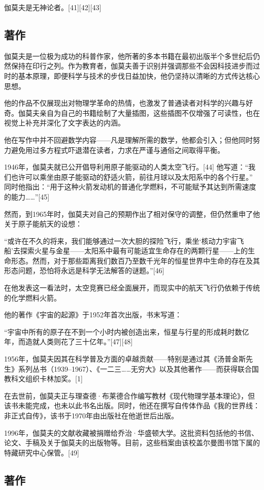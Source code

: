 伽莫夫是无神论者。[41][42][43]
\subsection{著作}
伽莫夫是一位极为成功的科普作家，他所著的多本书籍在最初出版半个多世纪后仍然保持在印行之列。作为教育者，伽莫夫善于识别并强调那些不会因科技进步而过时的基本原理，即便科学与技术的步伐日益加快，他仍坚持以清晰的方式传达核心思想。

他的作品不仅展现出对物理学革命的热情，也激发了普通读者对科学的兴趣与好奇。伽莫夫亲自为自己的书籍绘制了大量插图，这些插图不仅增强了可读性，也在视觉上补充并深化了文字表达的内涵。

他在写作中并不回避数学内容——凡是理解所需的数学，他都会引入；但他同时努力避免用过多方程式吓退潜在读者，力求在严谨与通俗之间取得平衡。

1946年，伽莫夫就已公开倡导利用原子能驱动的人类太空飞行。[44]
他写道：“我们也许可以乘坐由原子能驱动的舒适火箭，前往月球以及太阳系中的各个行星。”
同时他指出：“用于这种火箭发动机的普通化学燃料，不可能赋予其达到所需速度的能力……”[45]

然而，到1965年时，伽莫夫对自己的预期作出了相对保守的调整，但仍然重申了他关于原子能航天的设想：

“或许在不久的将来，我们能够通过一次大胆的探险飞行，乘坐‘核动力宇宙飞船’去探索火星与金星——太阳系中最有可能适宜生命存在的两颗行星——上的生命形态。然而，对于那些距离我们数百乃至数千光年的恒星世界中生命的存在及其形态问题，恐怕将永远是科学无法解答的谜题。”[46]

在他发表这一看法时，太空竞赛已经全面展开，而现实中的航天飞行仍依赖于传统的化学燃料火箭。

他的著作《宇宙的起源》于1952年首次出版，书末写道：

“宇宙中所有的原子在不到一个小时内被创造出来，恒星与行星的形成耗时数亿年，而造就人类则花了三十亿年。”[47][48]

1956年，伽莫夫因其在科学普及方面的卓越贡献——特别是通过其《汤普金斯先生》系列丛书（1939–1967）、《一二三……无穷大》以及其他著作——而获得联合国教科文组织卡林加奖。[1]

在去世前，伽莫夫正与理查德·布莱德合作编写教材《现代物理学基本理论》，但该书未能完成，也未以此书名出版。同时，他还在撰写自传体作品《我的世界线：非正式自传》，该书于1970年由出版社在他逝世后出版。

1996年，伽莫夫的文献收藏被捐赠给乔治·华盛顿大学。这批资料包括他的书信、论文、手稿及关于伽莫夫的出版物等。目前，这些档案由该校盖尔曼图书馆下属的特藏研究中心保管。[49]
\subsection{著作}
